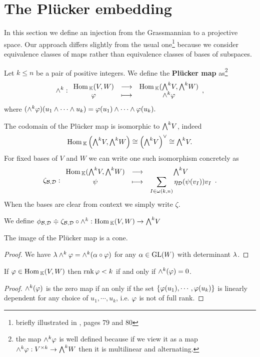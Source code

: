 \section{The Pl\"ucker embedding}
In this section we define an injection from the Grassmannian to a projective space.
Our approach differs slightly from the usual one\footnote{briefly illustrated in \cite{matroids}, pages 79 and 80} because we consider equivalence classes of maps rather than equivalence classes of bases of subspaces.

\begin{definition}
Let $k\leq n$ be a pair of positive integers. We define the \textbf{Pl\"ucker map} as\footnote{the map $\wedge^k\varphi$ is well defined because if we view it as a map $\wedge^k\vp:V^{\times k}\to \bw W$ then it is multilinear and alternating.}
\[\wedge^k:\funcDef{\Hom_\K(V,W)}{\Hom_\K(\bw V,\bw W)}{\vp}{\wedge^k\vp},\]
where $(\wedge^k\varphi)(u_1\wedge\cdots\wedge u_k)=\varphi(u_1)\wedge\cdots\wedge\varphi(u_k).$
\end{definition}

\begin{remark}\label{CodomainOfPluckerMap}
The codomain of the Pl\"ucker map is isomorphic to $\bw V$, indeed
\[\textstyle \Hom_\K\pa{\bw V,\bw W}\cong \pa{\bw V}^{\vee}\cong \bw V.\]
For fixed bases of $V$ and $W$ we can write one such isomorphism concretely as
\[\zeta_{\Bc,\Dc}:\funcDef{\Hom_\K(\bw V,\bw W)}{\bw V}{\psi}{\displaystyle\sum_{I\in\omega(k,n)} \eta_\Dc(\psi(v_I))v_I}.\]
When the bases are clear from context we simply write $\zeta$.
\end{remark}
\begin{notation}
We define $\phi_{\Bc,\Dc}\doteqdot \zeta_{\Bc,\Dc}\circ \wedge^k:\Hom_\K(V,W)\to \bw V$
\end{notation}


\begin{proposition}\label{ImagePluckerMapIsCone}
The image of the Pl\"ucker map is a cone.
\end{proposition}
\begin{proof}
We have $\lambda\wedge^k\varphi=\wedge^k(\alpha\circ \varphi)$ for any $\alpha\in \mathrm{GL}(W)$ with determinant $\lambda$.
\end{proof}


\begin{lemma}\label{WhenPluckerMapIsZero}
If $\varphi\in\mathrm{Hom}\,_{\mathbb{K}}(V,W)$ then $\mathrm{rnk}\, \varphi<k$ if and only if $\wedge^k(\varphi)=0$.
\end{lemma}
\begin{proof}
$\wedge^k(\varphi)$ is the zero map if an only if the set $\left\{{\varphi(u_1),\cdots, \varphi(u_k)}\right\}$ is linearly dependent for any choice of $u_1,\cdots, u_k$, i.e. $\varphi$ is not of full rank.
\end{proof}

